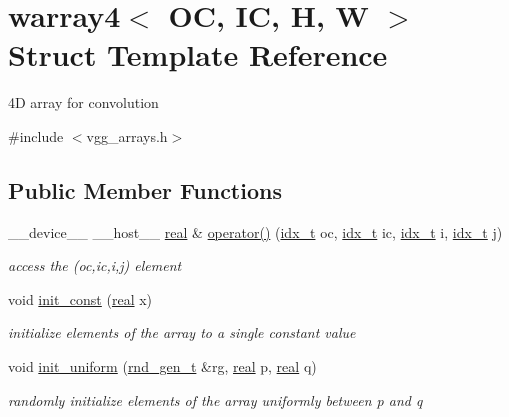 \hypertarget{structwarray4}{}\section{warray4$<$ OC, IC, H, W $>$ Struct Template Reference}
\label{structwarray4}


4D array for convolution  




{\ttfamily \#include $<$vgg\+\_\+arrays.\+h$>$}

\subsection*{Public Member Functions}
\begin{DoxyCompactItemize}
\item 
\+\_\+\+\_\+device\+\_\+\+\_\+ \+\_\+\+\_\+host\+\_\+\+\_\+ \hyperlink{vgg__util_8h_a1082d08aaa761215ec83e7149f27ad16}{real} \& \hyperlink{structwarray4_adc345b7b43d7d6ddf69a874e0fe4dc79}{operator()} (\hyperlink{vgg__util_8h_a8e93478a00e685bea5e6a3f617bf03a3}{idx\+\_\+t} oc, \hyperlink{vgg__util_8h_a8e93478a00e685bea5e6a3f617bf03a3}{idx\+\_\+t} ic, \hyperlink{vgg__util_8h_a8e93478a00e685bea5e6a3f617bf03a3}{idx\+\_\+t} i, \hyperlink{vgg__util_8h_a8e93478a00e685bea5e6a3f617bf03a3}{idx\+\_\+t} j)
\begin{DoxyCompactList}\small\item\em access the (oc,ic,i,j) element \end{DoxyCompactList}\item 
void \hyperlink{structwarray4_a3c04b39cc0eb077af47b1b7fcfb211fa}{init\+\_\+const} (\hyperlink{vgg__util_8h_a1082d08aaa761215ec83e7149f27ad16}{real} x)
\begin{DoxyCompactList}\small\item\em initialize elements of the array to a single constant value \end{DoxyCompactList}\item 
void \hyperlink{structwarray4_a788f2a7e91cdaab1c7364a6fa5262b82}{init\+\_\+uniform} (\hyperlink{structrnd__gen__t}{rnd\+\_\+gen\+\_\+t} \&rg, \hyperlink{vgg__util_8h_a1082d08aaa761215ec83e7149f27ad16}{real} p, \hyperlink{vgg__util_8h_a1082d08aaa761215ec83e7149f27ad16}{real} q)
\begin{DoxyCompactList}\small\item\em randomly initialize elements of the array uniformly between p and q \end{DoxyCompactList}\item 

\end{DoxyCompactItemize}
